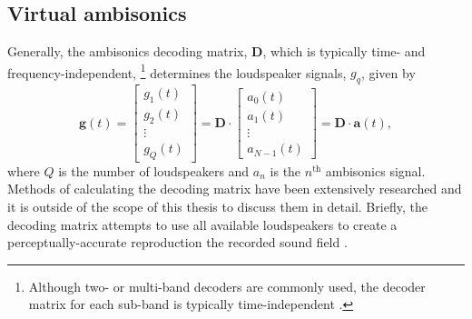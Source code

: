 \subsection{Virtual ambisonics}\label{sec:02_Acoustical_Theory:VA_Binaural}
Generally, the ambisonics decoding matrix, $\mathbf{D}$, which is typically time- and frequency-independent,%
\footnote{Although two- or multi-band decoders are commonly used, the decoder matrix for each sub-band is typically time-independent \citep{Heller2012}.}
determines the loudspeaker signals, $g_q$, given by
\begin{equation}\label{eq:02_Acoustical_Theory:Ambisonics_Decoding}
\mathbf{g}(t) = 
\begin{bmatrix}
g_{1}(t) \\ g_{2}(t) \\ \vdots \\ g_{Q}(t)
\end{bmatrix}
 = \mathbf{D} \cdot 
\begin{bmatrix}
a_{0}(t) \\ a_{1}(t) \\ \vdots \\ a_{N-1}(t)
\end{bmatrix}
 = \mathbf{D} \cdot \mathbf{a}(t),
\end{equation}
where $Q$ is the number of loudspeakers and $a_n$ is the $n^\text{th}$ ambisonics signal.
Methods of calculating the decoding matrix have been extensively researched and it is outside of the scope of this thesis to discuss them in detail.
Briefly, the decoding matrix attempts to use all available loudspeakers to create a perceptually-accurate reproduction the recorded sound field \citep{Heller2012}.

